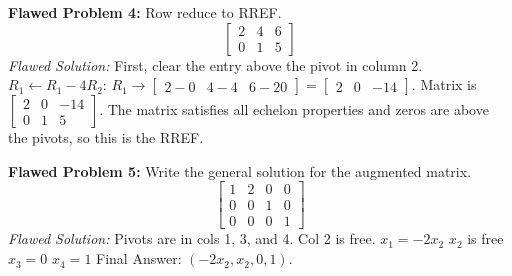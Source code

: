 \documentclass[11pt]{article}
\begin{document}
\vspace{0.3cm}
\textbf{Flawed Problem 4:} Row reduce to RREF.
\[ \begin{bmatrix} 2 & 4 & 6 \\ 0 & 1 & 5 \end{bmatrix} \]
\textit{Flawed Solution:}
First, clear the entry above the pivot in column 2.
$R_1 \leftarrow R_1 - 4R_2$:
$R_1 \to \begin{bmatrix} 2 - 0 & 4 - 4 & 6 - 20 \end{bmatrix} = \begin{bmatrix} 2 & 0 & -14 \end{bmatrix}$.
Matrix is $\begin{bmatrix} 2 & 0 & -14 \\ 0 & 1 & 5 \end{bmatrix}$. 
The matrix satisfies all echelon properties and zeros are above the pivots, so this is the RREF.

\vspace{0.3cm}
\textbf{Flawed Problem 5:} Write the general solution for the augmented matrix.
\[ \begin{bmatrix} 1 & 2 & 0 & 0 \\ 0 & 0 & 1 & 0 \\ 0 & 0 & 0 & 1 \end{bmatrix} \]
\textit{Flawed Solution:}
Pivots are in cols 1, 3, and 4. Col 2 is free.
$x_1 = -2x_2$
$x_2$ is free
$x_3 = 0$
$x_4 = 1$
Final Answer: $( -2x_2, x_2, 0, 1 )$.
\end{document}
